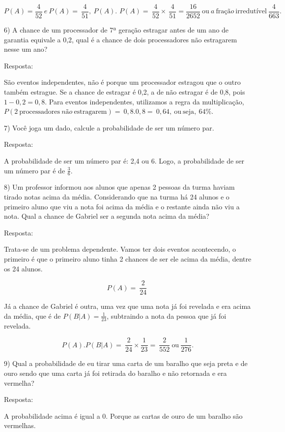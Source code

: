 {{{{{{{{{{{{{\[P\left( A \right) = \frac{4}{52}\ e\ P\left( A \right) = \ \frac{4}{51},\ P\left( A \right)\text{.\ }P\left( A \right) = \ \frac{4}{52} \times \ \frac{4}{51} = \frac{16}{2652}\ \text{ou}\ a\ \text{fra}ção\ \text{irredut}í\text{vel}\ \frac{4}{663}.\]

6) A chance de um processador de 7ª geração estragar antes de um ano de
garantia equivale a 0,2, qual é a chance de dois processadores não
estragarem nesse um ano?

Resposta:

São eventos independentes, não é porque um processador estragou que o
outro também estrague. Se a chance de estragar é 0,2, a de não estragar
é de 0,8, pois \(1 - 0,2 = 0,8\). Para eventos independentes, utilizamos
a regra da multiplicação,
\(P(2\ \text{processad}\text{ores}\ não\ \text{estragarem}) = \ 0,8.0,8 = \ 0,64,\ \text{ou}\ \text{seja},\ 64\%.\)

7) Você joga um dado, calcule a probabilidade de ser um número par.

Resposta:

A probabilidade de ser um número par é: 2,4 ou 6. Logo, a probabilidade
de ser um número par é de \(\frac{3}{6}\).

8) Um professor informou aos alunos que apenas 2 pessoas da turma haviam
tirado notas acima da média. Considerando que na turma há 24 alunos e o
primeiro aluno que viu a nota foi acima da média e o restante ainda não
viu a nota. Qual a chance de Gabriel ser a segunda nota acima da média?

Resposta:

Trata-se de um problema dependente. Vamos ter dois eventos acontecendo,
o primeiro é que o primeiro aluno tinha 2 chances de ser ele acima da
média, dentre os 24 alunos.

\[P(A) = \ \frac{2}{24}\ \]

Já a chance de Gabriel é outra, uma vez que uma nota já foi revelada e
era acima da média, que é de \(P(B|A) = \frac{1}{23}\), subtraindo a
nota da pessoa que já foi revelada.

\[P(A).P(B|A) = \ \frac{2}{24} \times \frac{1}{23} = \ \frac{2}{552}\ \text{ou}\ \frac{1}{276}.\]

9) Qual a probabilidade de eu tirar uma carta de um baralho que seja
preta e de ouro sendo que uma carta já foi retirada do baralho e não
retornada e era vermelha?

Resposta:

A probabilidade acima é igual a 0. Porque as cartas de ouro de um
baralho são vermelhas.

}}}}}}}}}}}}}
